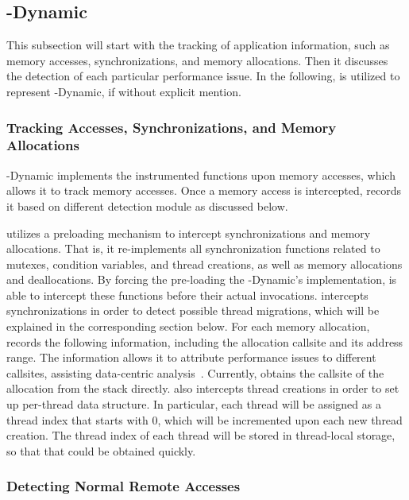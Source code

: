 \subsection{\NP{}-Dynamic}

This subsection will start with the tracking of application information, such as memory accesses, synchronizations, and memory allocations. Then it discusses the detection of each particular performance issue.  In the following, \NP{} is utilized to represent \NP{}-Dynamic, if without explicit mention. 

\subsubsection{Tracking Accesses, Synchronizations, and Memory Allocations}

\NP{}-Dynamic implements the instrumented functions upon memory accesses, which allows it to track memory accesses. Once a memory access is intercepted, \NP{} records it based on different detection module as discussed below. 

\NP{} utilizes a preloading mechanism to intercept synchronizations and memory allocations. That is, it re-implements all synchronization functions related to  mutexes, condition variables, and thread creations, as well as memory allocations and deallocations. By forcing the pre-loading the \NP{}-Dynamic's implementation, \NP{} is able to intercept these functions before their actual invocations. \NP{} intercepts synchronizations in order to detect possible thread migrations, which will be explained in the corresponding section below. For each memory allocation, \NP{} records the following information, including the allocation callsite and its address range. The information allows it to attribute performance issues to different callsites, assisting data-centric analysis~\cite{XuNuma}. Currently, \NP{} obtains the callsite of the allocation from the stack directly.  \NP{} also intercepts thread creations in order to set up per-thread data structure. In particular, each thread will be assigned as a thread index that starts with 0, which will be incremented upon each new thread creation. The thread index of each thread will be stored in thread-local storage, so that that could be obtained quickly. 

\subsubsection{Detecting Normal Remote Accesses}

